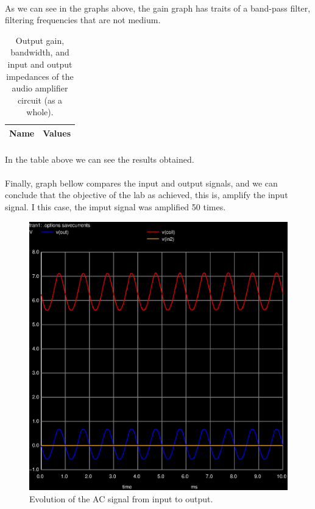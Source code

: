 \paragraph{} As we can see in the graphs above, the gain graph has traits of a band-pass filter, filtering frequencies that are not medium.

\begin{table}[h]
  \centering
  \begin{tabular}{|l|r|}
    \hline    
    {\bf Name} & {\bf Values} \\ \hline
    
         
  \end{tabular}
  \caption{Output gain, bandwidth, and input and output impedances of the audio amplifier circuit (as a whole).}
  \label{tab:main}
\end{table}

\paragraph{} In the table above we can see the results obtained.

\paragraph{} Finally, graph bellow compares the input and output signals, and we can conclude that the objective of the lab as achieved, this is, amplify the input signal. I this case, the imput signal 
was amplified 50 times.

\begin{figure}[!h] \centering
\includegraphics[width=0.6\linewidth]{comp.eps}
\caption{Evolution of the AC signal from input to output.}
\label{fig:comp}
\end{figure}

\clearpage
